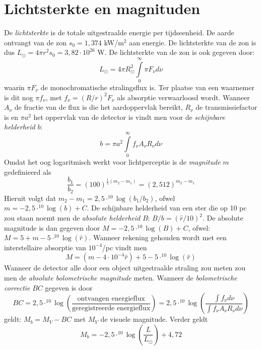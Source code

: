 \section{Lichtsterkte en magnituden}
De {\it lichtsterkte} is de totale uitgestraalde energie per tijdseenheid.
De aarde ontvangt van de zon $s_0=1,374$ kW/m$^2$ aan energie. De
lichtsterkte van de zon is dus $L_\odot=4\pi r^2s_0=3,82\cdot10^{26}$ W. De
lichtsterkte van de zon is ook gegeven door:
\[
L_\odot=4\pi R_\odot^2\int\limits_0^\infty \pi F_\nu d\nu
\]
waarin $\pi F_\nu$ de monochromatische stralingsflux is. Ter plaatse van een
waarnemer is dit nog $\pi f_\nu$, met $f_\nu=(R/r)^2F_\nu$ als absorptie
verwaarloosd wordt. Wanneer $A_\nu$ de fractie van de flux is die het
aardoppervlak bereikt, $R_\nu$ de transmissiefactor is en $\pi a^2$ het
oppervlak van de detector is vindt men voor de {\it schijnbare helderheid} $b$:
\[
b=\pi a^2\int\limits_0^\infty f_\nu A_\nu R_\nu d\nu
\]
Omdat het oog logaritmisch werkt voor lichtperceptie is de {\it magnitude}
$m$ gedefinieerd als
\[
\frac{b_1}{b_2}=(100)^{\frac{1}{5}(m_2-m_1)}=(2,512)^{m_2-m_1}
\]
Hieruit volgt dat $m_2-m_1=2,5\cdot^{10}\log(b_1/b_2)$, ofwel $m=-2,5\cdot^{10}\log(b)+C$.
De schijnbare helderheid van een ster die op 10 pc zou staan noemt men de
{\it absolute helderheid} $B$: $B/b=(\hat{r}/10)^2$. De absolute magnitude is
dan gegeven door $M=-2,5\cdot^{10}\log(B)+C$, ofwel:
$M=5+m-5\cdot^{10}\log(\hat{r})$. Wanneer rekening gehouden wordt met een
interstellaire absorptie van $10^{-4}$/pc vindt men
\[
M=(m-4\cdot10^{-4}\hat{r})+5-5\cdot^{10}\log(\hat{r})
\]
Wanneer de detector alle door een object uitgestraalde straling zou meten zou
men de {\it absolute bolometrische magnitude} meten. Wanneer de
{\it bolometrische correctie} $BC$ gegeven is door
\[
BC=2,5\cdot^{10}\log\left(\frac{\mbox{ontvangen energieflux}}{\mbox{geregistreerde energieflux}}\right)=
2,5\cdot^{10}\log\left(\frac{\int f_\nu d\nu}{\int f_\nu A_\nu R_\nu d\nu}\right)
\]
geldt: $M_b=M_V-BC$ met $M_V$ de visuele magnitude. Verder geldt
\[
M_b=-2,5\cdot^{10}\log\left(\frac{L}{L_\odot}\right)+4,72
\]

